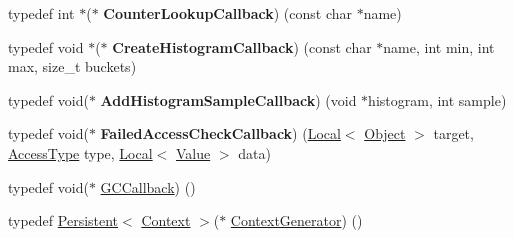 \begin{DoxyCompactItemize}
\item 
\hypertarget{namespacev8_a5efca05a9f1f278a4eec832ce419104f}{}typedef int $\ast$($\ast$ {\bfseries Counter\+Lookup\+Callback}) (const char $\ast$name)\label{namespacev8_a5efca05a9f1f278a4eec832ce419104f}

\item 
\hypertarget{namespacev8_aafbf15734701792a14c02dbca7535b75}{}typedef void $\ast$($\ast$ {\bfseries Create\+Histogram\+Callback}) (const char $\ast$name, int min, int max, size\+\_\+t buckets)\label{namespacev8_aafbf15734701792a14c02dbca7535b75}

\item 
\hypertarget{namespacev8_a5a7c6bb8050ad84f0a453056ec325d1c}{}typedef void($\ast$ {\bfseries Add\+Histogram\+Sample\+Callback}) (void $\ast$histogram, int sample)\label{namespacev8_a5a7c6bb8050ad84f0a453056ec325d1c}

\item 
\hypertarget{namespacev8_a1352a0d6e487b7092ea79e2d3d4ecd12}{}typedef void($\ast$ {\bfseries Failed\+Access\+Check\+Callback}) (\hyperlink{classv8_1_1_local}{Local}$<$ \hyperlink{classv8_1_1_object}{Object} $>$ target, \hyperlink{namespacev8_add8bef6469c5b94706584124e610046c}{Access\+Type} type, \hyperlink{classv8_1_1_local}{Local}$<$ \hyperlink{classv8_1_1_value}{Value} $>$ data)\label{namespacev8_a1352a0d6e487b7092ea79e2d3d4ecd12}

\item 
typedef void($\ast$ \hyperlink{namespacev8_a226458957ce3c253b9a9f539bb5ddad4}{G\+C\+Callback}) ()
\item 
typedef \hyperlink{classv8_1_1_persistent}{Persistent}$<$ \hyperlink{classv8_1_1_context}{Context} $>$($\ast$ \hyperlink{namespacev8_a7218225c425a91cdcff3ec9130fb4ed4}{Context\+Generator}) ()
\end{DoxyCompactItemize}
